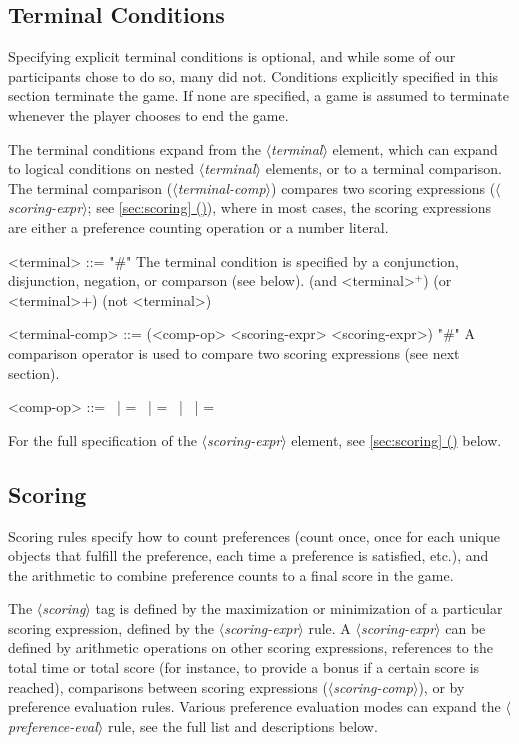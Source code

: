 \documentclass{article}
\newcommand{\dsl}[1]{{\it $\langle$#1$\rangle$}}
\newcommand*{\fullref}[1]{\hyperref[{#1}]{\autoref*{#1} (\nameref*{#1})}} %
\begin{document}
\subsection{Terminal Conditions} \label{sec:terminal}
Specifying explicit terminal conditions is optional, and while some of our participants chose to do so, many did not.
Conditions explicitly specified in this section terminate the game.
If none are specified, a game is assumed to terminate whenever the player chooses to end the game.

The terminal conditions expand from the \dsl{terminal} element, which can expand to logical conditions on nested \dsl{terminal} elements, or to a terminal comparison.
The terminal comparison (\dsl{terminal-comp}) compares two scoring expressions (\dsl{scoring-expr}; see \fullref{sec:scoring}), where in most cases, the scoring expressions are either a preference counting operation or a number literal.

\begin{grammar}
<terminal> ::= "#" The terminal condition is specified by a conjunction, disjunction, negation, or comparson (see below).
        \alt (and <terminal>$^+$)
        \alt (or <terminal>$+$)
        \alt (not <terminal>)

<terminal-comp> ::= (<comp-op> <scoring-expr> <scoring-expr>) "#" A comparison operator is used to compare two scoring expressions (see next section).

    <comp-op> ::=  \textlangle \ | \textlangle = \ | = \ | \textrangle \ | \textrangle =



\end{grammar}
For the full specification of the \dsl{scoring-expr} element, see \fullref{sec:scoring} below.



\subsection{Scoring} \label{sec:scoring}
Scoring rules specify how to count preferences (count once, once for each unique objects that fulfill the preference, each time a preference is satisfied, etc.), and the arithmetic to combine preference counts to a final score in the game.

The \dsl{scoring} tag is defined by the maximization or minimization of a particular scoring expression, defined by the \dsl{scoring-expr} rule.
A \dsl{scoring-expr} can be defined by arithmetic operations on other scoring expressions, references to the total time or total score (for instance, to provide a bonus if a certain score is reached), comparisons between scoring expressions (\dsl{scoring-comp}), or by preference evaluation rules.
Various preference evaluation modes can expand the \dsl{preference-eval} rule, see the full list and descriptions below.
\end{document}
